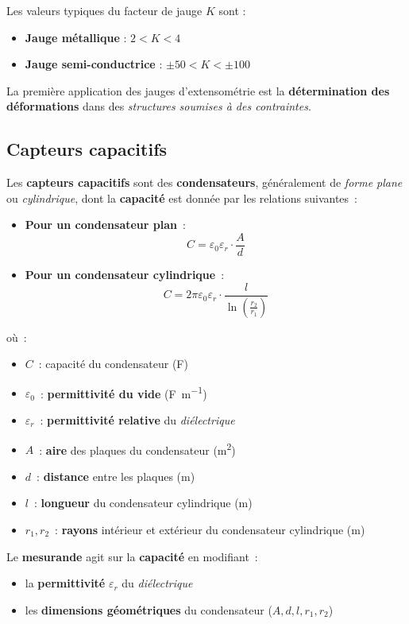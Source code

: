 Les valeurs typiques du facteur de jauge \( K \) sont :
\begin{itemize}
    \item \textbf{Jauge métallique} : \( 2 < K < 4 \)
    \item \textbf{Jauge semi-conductrice} : \( \pm 50 < K < \pm 100 \)
\end{itemize}

La première application des jauges d'extensométrie est la 
\textbf{détermination des déformations} dans des 
\textit{structures soumises à des contraintes}.

\subsection*{Capteurs capacitifs}

Les \textbf{capteurs capacitifs} sont des \textbf{condensateurs}, généralement 
de \textit{forme plane} ou \textit{cylindrique}, dont la \textbf{capacité} est 
donnée par les relations suivantes~:

\begin{itemize}
    \item \textbf{Pour un condensateur plan}~:
    \begin{equation}
        C = \varepsilon_0 \varepsilon_r \cdot \frac{A}{d}
    \end{equation}
    
    \item \textbf{Pour un condensateur cylindrique}~:
    \begin{equation}
        C = 2 \pi \varepsilon_0 \varepsilon_r \cdot \frac{l}{\ln \left( \frac{r_2}{r_1} \right)}
    \end{equation}
\end{itemize}

où~:
\begin{itemize}
    \item \( C \)~: capacité du condensateur (\si{\farad})
    \item \( \varepsilon_0 \)~: \textbf{permittivité du vide} (\si{\farad\per\meter})
    \item \( \varepsilon_r \)~: \textbf{permittivité relative} du \textit{diélectrique}
    \item \( A \)~: \textbf{aire} des plaques du condensateur (\si{\meter\squared})
    \item \( d \)~: \textbf{distance} entre les plaques (\si{\meter})
    \item \( l \)~: \textbf{longueur} du condensateur cylindrique (\si{\meter})
    \item \( r_1, r_2 \)~: \textbf{rayons} intérieur et extérieur du condensateur cylindrique (\si{\meter})
\end{itemize}

Le \textbf{mesurande} agit sur la \textbf{capacité} en modifiant~:
\begin{itemize}
    \item la \textbf{permittivité} \( \varepsilon_r \) du \textit{diélectrique}
    \item les \textbf{dimensions géométriques} du condensateur (\( A, d, l, r_1, r_2 \))
\end{itemize}
